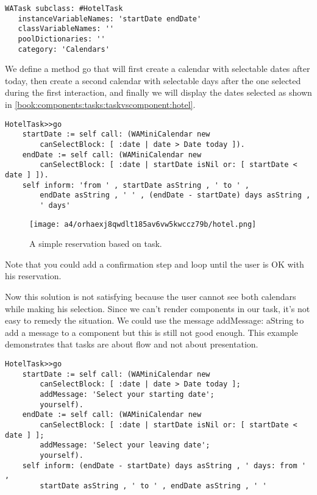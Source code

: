 \documentclass[a4paper,10pt,twoside]{book}
\newcommand{\ct}[1]{{\small\ttfamily\textup{#1}}}
\begin{document}
\begin{lstlisting}
WATask subclass: #HotelTask
   instanceVariableNames: 'startDate endDate'
   classVariableNames: ''
   poolDictionaries: ''
   category: 'Calendars'
\end{lstlisting}

We define a method \ct{go} that will first create a calendar with selectable dates after today, then create a second calendar with selectable days after the one selected during the first interaction, and finally we will display the dates selected as shown in \autoref{book:components:tasks:taskvscomponent:hotel}.

\begin{lstlisting}
HotelTask>>go
    startDate := self call: (WAMiniCalendar new
        canSelectBlock: [ :date | date > Date today ]).
    endDate := self call: (WAMiniCalendar new
        canSelectBlock: [ :date | startDate isNil or: [ startDate < date ] ]).
    self inform: 'from ' , startDate asString , ' to ' , 
        endDate asString , ' ' , (endDate - startDate) days asString , 
        ' days'
\end{lstlisting}

\begin{figure}[h!tbp]
	\begin{center}
		\texttt{[image: a4/orhaexj8qwdlt185av6vw5kwccz79b/hotel.png]}
		\caption{A simple reservation based on task.\label{book:components:tasks:taskvscomponent:hotel}}
	\end{center}
\end{figure}


Note that you could add a confirmation step and loop until the user is OK with his reservation.

Now this solution is not satisfying because the user cannot see both calendars while making his selection. Since we can't render components in our task, it's not easy to remedy the situation. We could use the message \ct{addMessage: aString} to add a message to a component but this is still not good enough. This example demonstrates that tasks are about flow and not about presentation.

\begin{lstlisting}
HotelTask>>go
    startDate := self call: (WAMiniCalendar new
        canSelectBlock: [ :date | date > Date today ];
        addMessage: 'Select your starting date';
        yourself).
    endDate := self call: (WAMiniCalendar new
        canSelectBlock: [ :date | startDate isNil or: [ startDate < date ] ];
        addMessage: 'Select your leaving date';
        yourself).
    self inform: (endDate - startDate) days asString , ' days: from ' ,
        startDate asString , ' to ' , endDate asString , ' '
\end{lstlisting}
\end{document}
